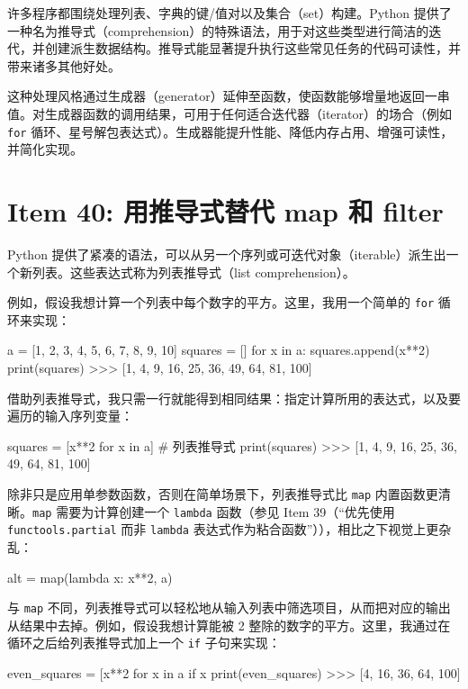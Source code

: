 许多程序都围绕处理列表、字典的键/值对以及集合（set）构建。Python 提供了一种名为推导式（comprehension）的特殊语法，用于对这些类型进行简洁的迭代，并创建派生数据结构。推导式能显著提升执行这些常见任务的代码可读性，并带来诸多其他好处。

这种处理风格通过生成器（generator）延伸至函数，使函数能够增量地返回一串值。对生成器函数的调用结果，可用于任何适合迭代器（iterator）的场合（例如 \texttt{for} 循环、星号解包表达式）。生成器能提升性能、降低内存占用、增强可读性，并简化实现。

\section{Item 40: 用推导式替代 map 和 filter}

Python 提供了紧凑的语法，可以从另一个序列或可迭代对象（iterable）派生出一个新列表。这些表达式称为列表推导式（list comprehension）。

例如，假设我想计算一个列表中每个数字的平方。这里，我用一个简单的 \texttt{for} 循环来实现：

\begin{codebox}[python]
a = [1, 2, 3, 4, 5, 6, 7, 8, 9, 10]
squares = []
for x in a:
    squares.append(x**2)
print(squares)
>>>
[1, 4, 9, 16, 25, 36, 49, 64, 81, 100]
\end{codebox}

借助列表推导式，我只需一行就能得到相同结果：指定计算所用的表达式，以及要遍历的输入序列变量：

\begin{codebox}[python]
squares = [x**2 for x in a]  # 列表推导式
print(squares)
>>>
[1, 4, 9, 16, 25, 36, 49, 64, 81, 100]
\end{codebox}

除非只是应用单参数函数，否则在简单场景下，列表推导式比 \texttt{map} 内置函数更清晰。\texttt{map} 需要为计算创建一个 \texttt{lambda} 函数（参见 Item 39（``优先使用 \texttt{functools.partial} 而非 \texttt{lambda} 表达式作为粘合函数''）），相比之下视觉上更杂乱：

\begin{codebox}[python]
alt = map(lambda x: x**2, a)
\end{codebox}

与 \texttt{map} 不同，列表推导式可以轻松地从输入列表中筛选项目，从而把对应的输出从结果中去掉。例如，假设我想计算能被 2 整除的数字的平方。这里，我通过在循环之后给列表推导式加上一个 \texttt{if} 子句来实现：

\begin{codebox}[python]
even_squares = [x**2 for x in a if x %
print(even_squares)
>>>
[4, 16, 36, 64, 100]
\end{codebox}

